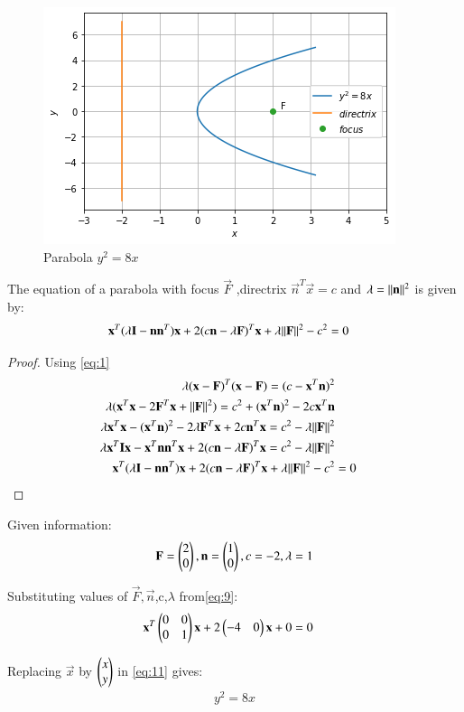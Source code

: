 \documentclass[journal,12pt,twocolumn]{IEEEtran}
\begin{document}
\begin{figure}[!ht]
\centering
\includegraphics[width=\columnwidth]{figure4}
\caption{Parabola $y^2=8x$ }
\label{fig:parabola}	
\end{figure}


\begin{theorem}
The equation of a parabola with focus $\vec{F}$ ,directrix $\vec{n}^T\vec{x}=c$ and $\lambda=\Vert\mathbf{n}\rVert^2$ is given by:
\begin{align}
\mathbf{x}^T(\lambda\mathbf{I}-\mathbf{n}\mathbf{n}^T)\mathbf{x}+2(c\mathbf{n}-\lambda\mathbf{F})^T\mathbf{x}+\lambda\Vert\mathbf{F}\rVert^2-c^2&=0
\end{align}
\end{theorem}

\begin{proof}
Using \eqref{eq:1}
\begin{align}
\lambda(\mathbf{x}-\mathbf{F})^T(\mathbf{x}-\mathbf{F})=(c-\mathbf{x}^T\mathbf{n})^2
\\
\lambda(\mathbf{x}^T\mathbf{x}-2\mathbf{F}^T\mathbf{x}+\Vert\mathbf{F}\rVert^2)=c^2+(\mathbf{x}^T\mathbf{n})^2-2c\mathbf{x}^T\mathbf{n}\\
\lambda\mathbf{x}^T\mathbf{x}-(\mathbf{x}^T\mathbf{n})^2-2\lambda\mathbf{F}^T\mathbf{x}+2c\mathbf{n}^T\mathbf{x}=c^2-\lambda\Vert\mathbf{F}\rVert^2\\
\lambda\mathbf{x}^T\mathbf{I}\mathbf{x}-\mathbf{x}^T\mathbf{n}\mathbf{n}^T\mathbf{x}+2(c\mathbf{n}-\lambda\mathbf{F})^T\mathbf{x}=c^2-\lambda\Vert\mathbf{F}\rVert^2\\
\mathbf{x}^T(\lambda\mathbf{I}-\mathbf{n}\mathbf{n}^T)\mathbf{x}+2(c\mathbf{n}-\lambda\mathbf{F})^T\mathbf{x}+\lambda\Vert\mathbf{F}\rVert^2-c^2&=0\label{eq:8}
\end{align}
\end{proof}
Given information:
\begin{align}
\mathbf{F}=\begin{pmatrix}2\\0\end{pmatrix},
\mathbf{n}=\begin{pmatrix}1\\0\end{pmatrix},
c=-2\label{eq:9},
\lambda=1
\end{align}


Substituting values of $\vec{F},\vec{n}$,c,$\lambda$ from\eqref{eq:9}:
\begin{align}
\mathbf{x}^T\begin{pmatrix}0&0\\0&1\end{pmatrix}\mathbf{x}+2\begin{pmatrix}-4&0\end{pmatrix}\mathbf{x}+0&=0\label{eq:11}
\end{align}

Replacing $\vec{x}$ by $\begin{pmatrix}x\\y\end{pmatrix}$ in \eqref{eq:11} gives:
\begin{align}
y^2=8x
\end{align}
\end{document}
